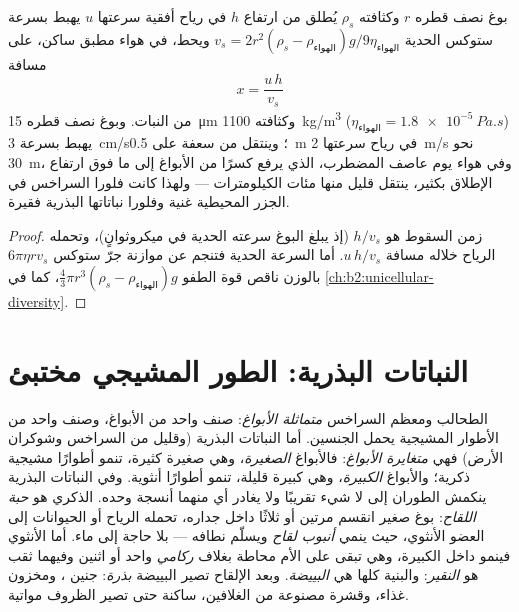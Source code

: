 \begin{theorem}\label{thm:b2:plant-life-cycles:dispersal}
بوغ نصف قطره $r$ وكثافته $\rho_s$ يُطلق من ارتفاع $h$
في رياح أفقية سرعتها $u$ يهبط بسرعة ستوكس الحدية
$v_s = 2r^2(\rho_s - \rho_{\text{الهواء}})g/9\eta_{\text{الهواء}}$
ويحط، في هواء مطبق ساكن، على مسافة
\[
x = \frac{u\,h}{v_s}
\]
من النبات. وبوغ  نصف قطره \qty{15}{\micro m} وكثافته
\qty{1100}{kg/m^3} ($\eta_{\text{الهواء}} = \qty{1.8e-5}{Pa.s}$)
يهبط بسرعة \qty{3}{cm/s}؛ وينتقل من سعفة على \qty{0.5}{m} في رياح
سرعتها \qty{2}{m/s} نحو \qty{30}{m}، وفي هواء يوم عاصف المضطرب،
الذي يرفع كسرًا من الأبواغ إلى ما فوق ارتفاع الإطلاق بكثير، ينتقل
قليل منها مئات الكيلومترات --- ولهذا كانت فلورا السراخس في الجزر
المحيطية غنية وفلورا نباتاتها البذرية فقيرة.
\end{theorem}
\begin{proof}
زمن السقوط هو $h/v_s$ (إذ يبلغ البوغ سرعته الحدية في
ميكروثوانٍ)، وتحمله الرياح خلاله مسافة $u\,h/v_s$. أما السرعة
الحدية فتنجم عن موازنة جرّ ستوكس $6\pi\eta r
v_s$ بالوزن ناقص قوة الطفو $\tfrac43\pi r^3(\rho_s -
\rho_{\text{الهواء}})g$، كما في \cref{ch:b2:unicellular-diversity}.
\end{proof}

\section{النباتات البذرية: الطور المشيجي مختبئ}

\begin{definition}\label{def:b2:plant-life-cycles:heterospory}
الطحالب ومعظم السراخس \emph{متماثلة الأبواغ}: صنف واحد من الأبواغ،
وصنف واحد من الأطوار المشيجية يحمل الجنسين. أما النباتات البذرية
(وقليل من السراخس وشوكران الأرض) فهي \emph{متغايرة الأبواغ}: فالأبواغ
\emph{الصغيرة}، وهي صغيرة كثيرة، تنمو أطوارًا مشيجية ذكرية؛
والأبواغ \emph{الكبيرة}، وهي كبيرة قليلة، تنمو أطوارًا أنثوية. وفي
النباتات البذرية ينكمش الطوران إلى لا شيء تقريبًا ولا يغادر أي
منهما أنسجة  وحده.  الذكري هو \emph{حبة
اللقاح}: بوغ صغير انقسم مرتين أو ثلاثًا داخل جداره، تحمله الرياح أو
الحيوانات إلى العضو الأنثوي، حيث ينمي \emph{أنبوب لقاح}
ويسلّم نطافه --- بلا حاجة إلى ماء. أما  الأنثوي فينمو
داخل  الكبيرة، وهي تبقى على الأم محاطة بغلاف
\emph{ركامي} واحد أو اثنين وفيهما ثقب هو \emph{النقير}: والبنية كلها
هي \emph{البييضة}. وبعد الإلقاح تصير البييضة \emph{بذرة}: جنين ، ومخزون غذاء، وقشرة مصنوعة من الغلافين، ساكنة حتى تصير الظروف
مواتية.
\end{definition}

